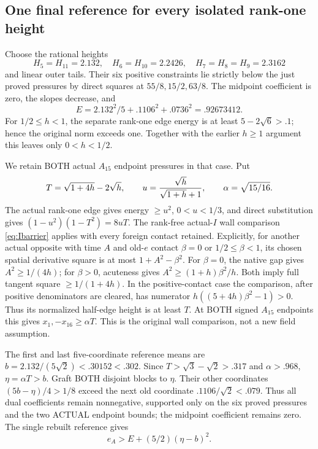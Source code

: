 \subsection{One final reference for every isolated rank-one height}
\label{app:arithA15isolatedcomposition}

Choose the rational heights
\[
 H_5=H_{11}=2.132,\quad H_6=H_{10}=2.2426,\quad
 H_7=H_8=H_9=2.3162
\]
and linear outer tails.
Their six positive constraints lie strictly below the just
proved pressures by direct squares at \(55/8,15/2,63/8\).
The midpoint coefficient is zero, the slopes decrease, and
\[
                 E=2.132^2/5+.1106^2+.0736^2=.92673412 .
\]
For \(1/2\le h<1\), the separate rank-one edge energy is
at least \(5-2\sqrt6>.1\); hence the original norm exceeds one.
Together with the earlier \(h\ge1\) argument this leaves
only \(0<h<1/2\).

We retain BOTH actual \(A_{15}\) endpoint pressures in that case.
Put
\[
 T=\sqrt{1+4h}-2\sqrt h,\qquad
 u={\sqrt h\over\sqrt{1+h}+1},\qquad
 \alpha=\sqrt{15/16}.
\]
The actual rank-one edge gives energy \(\ge u^2\), \(0<u<1/3\),
and direct substitution gives
\((1-u^2)(1-T^2)=8uT\).
The rank-free actual-\(I\) wall comparison
\eqref{eq:Ibarrier} applies with every foreign contact retained.
Explicitly, for another actual opposite with time \(A\)
and old-\(e\) contact \(\beta=0\) or \(1/2\le\beta<1\),
its chosen spatial derivative square is at most
\(1+A^2-\beta^2\).
For \(\beta=0\), the native gap gives \(A^2\ge1/(4h)\);
for \(\beta>0\), acuteness gives
\(A^2\ge(1+h)\beta^2/h\).
Both imply full tangent square \(\ge1/(1+4h)\).
In the positive-contact case the comparison, after positive
denominators are cleared, has numerator
\(h((5+4h)\beta^2-1)>0\).
Thus its normalized half-edge height is at least \(T\).
At BOTH signed \(A_{15}\) endpoints this gives
\(x_1,-x_{16}\ge\alpha T\).
This is the original wall comparison, not a new field assumption.

The first and last five-coordinate reference means are
\(b=2.132/(5\sqrt2)<.30152<.302\).
Since \(T>\sqrt3-\sqrt2>.317\) and \(\alpha>.968\),
\(\eta=\alpha T>b\).
Graft BOTH disjoint blocks to \(\eta\).
Their other coordinates
\((5b-\eta)/4>1/8\) exceed the next old coordinate
\(.1106/\sqrt2<.079\).
Thus all dual coefficients remain nonnegative, supported only
on the six proved pressures and the two ACTUAL endpoint bounds;
the midpoint coefficient remains zero.
The single rebuilt reference gives
\[
                         e_A>E+(5/2)(\eta-b)^2 .
\]

